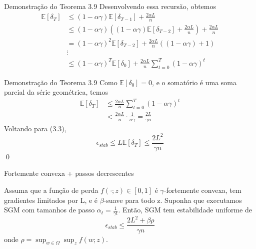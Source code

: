 \documentclass{beamer}
\newcommand{\EE}{\mathbb{E}}
\begin{document}
\begin{frame}{Demonstração do Teorema 3.9} 
    Desenvolvendo essa recursão, obtemos
    \begin{align*}
        \EE[\delta_T] &\le (1-\alpha\gamma)\EE[\delta_{T-1}] + \frac{2\alpha L}{n} \\
        &\le (1-\alpha\gamma)\left((1-\alpha\gamma)\EE[\delta_{T-2}] + \frac{2\alpha L}{n}\right) + \frac{2\alpha L}{n}\\ 
        &= (1-\alpha\gamma)^2\EE[\delta_{T-2}] + \frac{2\alpha L}{n}\left((1-\alpha\gamma) + 1\right) \\
        &\vdots \\
        &\le (1-\alpha\gamma)^{T}\EE[\delta_0] + \frac{2\alpha L}{n}\sum_{t=0}^{T}(1-\alpha\gamma)^t
    \end{align*}
\end{frame}


\begin{frame}{Demonstração do Teorema 3.9}
    Como \(\EE[\delta_0]=0\), e o somatório é uma soma parcial da série geométrica, temos
    \begin{align*}
        \EE[\delta_T] &\le \frac{2\alpha L}{n}\sum_{t=0}^{T}(1-\alpha\gamma)^t \\
        &< \frac{2\alpha L}{n}\cdot\frac{1}{\alpha\gamma} =\frac{2L}{\gamma n}
\end{align*}
Voltando para (3.3), $$\epsilon_{stab} \le  L\EE[\delta_{T}] \le \frac{2L^2}{\gamma n}$$
\qed
\end{frame}

\begin{frame}{Fortemente convexa + passos decrescentes}
\begin{theorem}[3.10]
Assuma que a função de perda \(f(\cdot;z) \in [0,1]\) é \(\gamma\)-fortemente convexa, tem gradientes limitados por L, e é \(\beta\)-suave para todo z.  Suponha que executamos SGM com tamanhos de passo \(\alpha_{t} = \frac{1}{\gamma t}\). Então, SGM tem estabilidade uniforme de
$$ \epsilon_{stab} \le \frac{2L^2 + \beta\rho}{\gamma n} $$
onde \(\rho = \sup_{w\in\Omega}\sup_{z}f(w;z)\). 
\end{theorem}
\end{frame}

\end{document}
